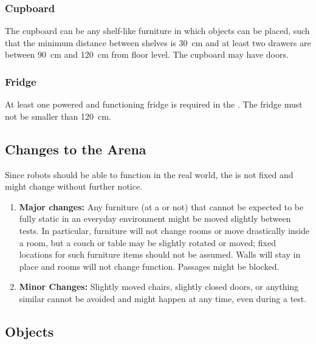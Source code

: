 \subsubsection{Cupboard}

The cupboard can be any shelf-like furniture in which objects can be placed, such that the minimum distance between shelves is \SI{30}{\centi\meter} and at least two drawers are between \SI{90}{\centi\meter} and \SI{120}{\centi\meter} from floor level.
The cupboard may have doors.

\subsubsection{Fridge}

At least one powered and functioning fridge is required in the \Arena.
The fridge must not be smaller than \SI{120}{\centi\meter}.

\subsection{Changes to the Arena}
\label{rule:scenario_changes}

Since robots should be able to function in the real world, the \Arena{} is not fixed and might change without further notice.
\begin{enumerate}
	\item \textbf{Major changes:}
	Any furniture (at a \PredefinedLocation{} or not) that cannot be expected to be fully static in an everyday environment might be moved slightly between tests.
	In particular, furniture will not change rooms or move drastically inside a room, but a couch or table may be slightly rotated or moved; fixed locations for such furniture items should not be assumed.
	Walls will stay in place and rooms will not change function.
	Passages might be blocked.
	\item \textbf{Minor Changes:} Slightly moved chairs, slightly closed doors, or anything similar cannot be avoided and might happen at any time, even during a test.
\end{enumerate}


%
%
%
\def\NumObjects{30\ }
\def\NumLocations{20\ }
\def\NumNames{20\ }

\subsection{Objects}
\label{rule:scenario_objects}

